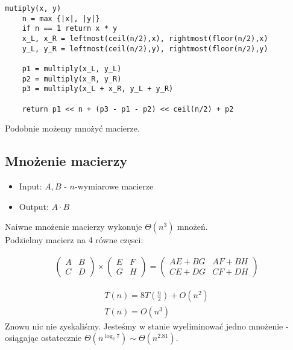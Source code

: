 \documentclass{article}
\numberwithin{equation}{subsection}
\begin{document}
\begin{verbatim}
mutiply(x, y)
    n = max {|x|, |y|}
    if n == 1 return x * y
    x_L, x_R = leftmost(ceil(n/2),x), rightmost(floor(n/2),x)
    y_L, y_R = leftmost(ceil(n/2),y), rightmost(floor(n/2),y)

    p1 = multiply(x_L, y_L)
    p2 = multiply(x_R, y_R)
    p3 = multiply(x_L + x_R, y_L + y_R)

    return p1 << n + (p3 - p1 - p2) << ceil(n/2) + p2
\end{verbatim}

\noindent
Podobnie możemy mnożyć macierze.

\subsection{Mnożenie macierzy}

\begin{itemize}
    \item Input: $A, B$ - $n$-wymiarowe macierze
    \item Output: $A \cdot B$
\end{itemize}

Naiwne mnożenie macierzy wykonuje $\Theta(n^3)$ mnożeń.\\

Podzielmy macierz na 4 równe częsci:

\begin{align}
    \begin{pmatrix}
        A & B\\
        C & D
    \end{pmatrix}
    \times
    \begin{pmatrix}
        E & F\\
        G & H
    \end{pmatrix}
    = 
    \begin{pmatrix}
        AE + BG & AF + BH\\
        CE + DG & CF + DH
    \end{pmatrix}
\end{align}

\begin{align}
    T(n) = 8T\left(\frac{n}{2}\right) + O(n^2)\\
    T(n) = O(n^3)
\end{align}
Znowu nic nie zyskaliśmy. Jesteśmy w stanie wyeliminować jedno mnożenie
- osiągając ostatecznie $\Theta(n^{\log_2 7}) \sim \Theta(n^{2.81})$.\\
\end{document}
